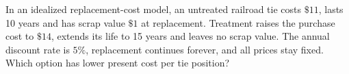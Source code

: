In an idealized replacement-cost model, an untreated railroad tie costs $\$11$, lasts 10 years and has scrap value $\$1$ at replacement. Treatment raises the purchase cost to $\$14$, extends its life to 15 years and leaves no scrap value. The annual discount rate is $5\%$, replacement continues forever, and all prices stay fixed. Which option has lower present cost per tie position?
